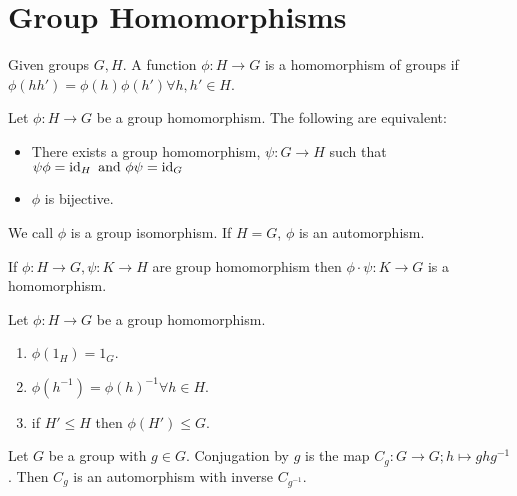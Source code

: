 \section{Group Homomorphisms}

\begin{definition}[Homomorphism]
    Given groups \(G, H\). A function \(\phi: H \to G\) is a homomorphism of groups if \(\phi(hh') = \phi(h)\phi(h') \forall h, h' \in H\).
\end{definition}


\begin{prop-defn}
Let \(\phi: H \to G\) be a group homomorphism. The following are equivalent:
\begin{itemize}
    \item There exists a group homomorphism, \(\psi: G \to H\) such that \(\psi\phi = \operatorname{id}_H \text{ and } \phi\psi = \operatorname{id}_G\)
    \item \(\phi\) is bijective.
\end{itemize}
We call \(\phi\) is a group isomorphism. If \(H = G\), \(\phi\) is an automorphism.
\end{prop-defn}

\begin{proposition}
    If \(\phi: H \to G, \psi: K \to H\) are group homomorphism then \(\phi \cdot \psi: K \to G\) is a homomorphism.
\end{proposition}

\begin{proposition}
    Let \(\phi: H \to G\) be a group homomorphism.
    \begin{enumerate}
        \item \(\phi(1_H) = 1_G\).
        \item \(\phi(h^{-1}) = \phi(h)^{-1} \forall h \in H\).
        \item if \(H' \leq H\) then \(\phi(H') \leq G\).
    \end{enumerate}
\end{proposition}

\begin{prop-defn}
Let \(G\) be a group with \(g \in G\). Conjugation by \(g\) is the map \(C_g: G \to G; h \mapsto ghg^{-1}\). Then \(C_g\) is an automorphism with inverse \(C_{g^{-1}}\).
\end{prop-defn}

